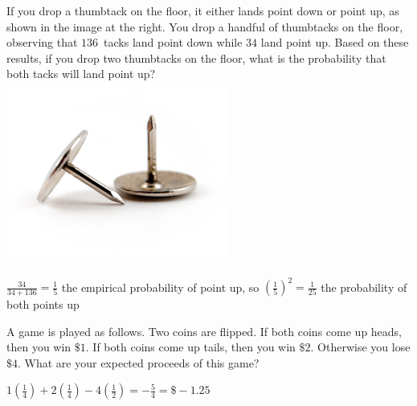 \documentclass[addpoints,12pt]{exam}
\begin{document}
\begin{questions}
\begin{solution}
\end{solution}
\newpage

\question[10]
\begin{multicols}{2}
If you drop a thumbtack on the floor, it either lands point down
or point up, as shown in the image at the right.
You drop a handful of thumbtacks on the floor, observing that
$136$~tacks land point down while $34$ land point up.
Based on these results, if you drop two thumbtacks on the floor, what
is the probability that both tacks will land point up?
\columnbreak\\
\includegraphics[scale=.6]{Thumbtacks}
\end{multicols}
\begin{solution}
$\frac{34}{34+136}=\frac{1}{5}$ the empirical probability
of point up, so $\left(\frac{1}{5}\right)^2=\frac{1}{25}$
the probability of both points up
\end{solution}
\vspace{2in}

\question[10] A game is played as follows.
Two coins are flipped. If both coins come up
heads, then you win $\$1$. If both coins come
up tails, then you win $\$2$. 
Otherwise you lose $\$4$. What are your expected proceeds
of this game?
\begin{solution}
$1\left(\frac{1}{4}\right)+2\left(\frac{1}{4}\right)
-4\left(\frac{1}{2}\right)=-\frac{5}{4}=\$-1.25$
\end{solution}

\end{questions}

\vfill
\begin{center}\gradetable[h][questions]\end{center}
\end{document}
